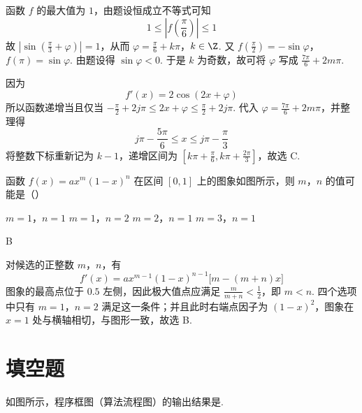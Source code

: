 \begin{solution}
函数 \(f\) 的最大值为 \(1\)，由题设恒成立不等式可知
\[
1\leqslant\left|f\left(\frac{\pi}{6}\right)\right|\leqslant1
\]
故 \(\left|\sin\left(\frac{\pi}{3}+\varphi\right)\right|=1\)，从而
\(\varphi=\frac{\pi}{6}+k\pi\)，\(k\in\Z\).
又
\(f\left(\frac{\pi}{2}\right)=-\sin\varphi\)，\(f(\pi)=\sin\varphi\).
由题设得 \(\sin\varphi<0\). 于是 \(k\) 为奇数，故可将 \(\varphi\) 写成 \(\frac{7\pi}{6}+2m\pi\).

因为
\[
f'(x)=2\cos(2x+\varphi)
\]
所以函数递增当且仅当 \(-\frac{\pi}{2}+2j\pi\leqslant2x+\varphi\leqslant\frac{\pi}{2}+2j\pi\). 代入 \(\varphi=\frac{7\pi}{6}+2m\pi\)，并整理得
\[
j\pi-\frac{5\pi}{6}\leqslant x\leqslant j\pi-\frac{\pi}{3}
\]
将整数下标重新记为 \(k-1\)，递增区间为 \(\left[k\pi+\frac{\pi}{6},k\pi+\frac{2\pi}{3}\right]\)，故选 C.
\end{solution}

\begin{problem}
函数 \( f(x) = ax^{m}(1 - x)^n \) 在区间 \([0,1]\) 上的图象如图所示，则 \(m\)，\(n\) 的值可能是（\quad）


\choices
    {\(m = 1\)，\(n = 1\)}
    {\(m = 1\)，\(n = 2\)}
    {\(m = 2\)，\(n = 1\)}
    {\(m = 3\)，\(n = 1\)}
\end{problem}

\begin{answer}
B
\end{answer}

\begin{solution}
对候选的正整数 \(m\)，\(n\)，有
\[
f'(x)=a x^{m-1}(1-x)^{n-1}\bigl[m-(m+n)x\bigr]
\]
图象的最高点位于 \(0.5\) 左侧，因此极大值点应满足 \(\frac{m}{m+n}<\frac12\)，即 \(m<n\). 四个选项中只有 \(m=1\)，\(n=2\) 满足这一条件；并且此时右端点因子为 \((1-x)^2\)，图象在 \(x=1\) 处与横轴相切，与图形一致，故选 B.
\end{solution}

\section{填空题}

\begin{problem}
如图所示，程序框图（算法流程图）的输出结果是\fillinblank{}.

\end{problem}

